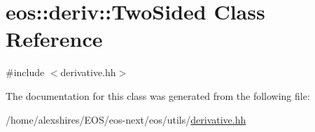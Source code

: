 \hypertarget{classeos_1_1deriv_1_1TwoSided}{
\section{eos::deriv::TwoSided Class Reference}
\label{classeos_1_1deriv_1_1TwoSided}
}


{\ttfamily \#include $<$derivative.hh$>$}

The documentation for this class was generated from the following file:\begin{DoxyCompactItemize}
\item 
/home/alexshires/EOS/eos-\/next/eos/utils/\hyperlink{derivative_8hh}{derivative.hh}\end{DoxyCompactItemize}
